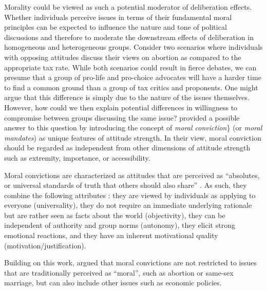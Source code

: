 \documentclass[11pt,]{article}
\begin{document}
Morality could be viewed as such a potential moderator of deliberation
effects. Whether individuals perceive issues in terms of their
fundamental moral principles can be expected to influence the nature and
tone of political discussions and therefore to moderate the downstream
effects of deliberation in homogeneous and heterogeneous groups.
Consider two scenarios where individuals with opposing attitudes discuss
their views on abortion as compared to the appropriate tax rate. While
both scenarios could result in fierce debates, we can presume that a
group of pro-life and pro-choice advocates will have a harder time to
find a common ground than a group of tax critics and proponents. One
might argue that this difference is simply due to the nature of the
issues themselves. However, how could we then explain potential
differences in willingness to compromise between groups discussing the
same issue? \citet{skitka2005moral} provided a possible answer to this
question by introducing the concept of \emph{moral conviction}\} (or
\emph{moral mandates}) as unique features of attitude strength. In their
view, moral conviction should be regarded as independent from other
dimensions of attitude strength such as extremity, importance, or
accessibility.

Moral convictions are characterized as attitudes that are perceived as
``absolutes, or universal standards of truth that others should also
share'' \citep[269]{skitka2010psychology}. As such, they combine the
following attributes \citep{skitka2010psychology}: they are viewed by
individuals as applying to everyone (universality), they do not require
an immediate underlying rationale but are rather seen as facts about the
world (objectivity), they can be independent of authority and group
norms (autonomy), they elicit strong emotional reactions, and they have
an inherent motivational quality (motivation/justification).

Building on this work, \citet{ryan2014reconsidering} argued that moral
convictions are not restricted to issues that are traditionally
perceived as ``moral'', such as abortion or same-sex marriage, but can
also include other issues such as economic policies.
\end{document}
